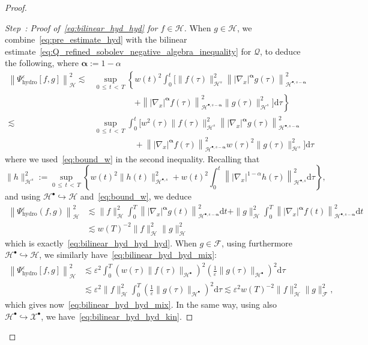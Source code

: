 \documentclass[10pt]{amsart}
\theoremstyle{definition}\newtheorem{defi}[theo]{Definition}\newtheorem{rema}[theo]{Remark}\newtheorem{exam}[theo]{Example}\newtheorem{exem}[theo]{Example}\newtheorem{nota}[theo]{Notation}
\newcommand{\hyd}{\mathrm{hydro}}
\renewcommand{\d}{\mathrm{d}}
\newcommand{\XX}{\mathcal{X}}
\newcommand{\HH}{\mathcal{H}}
\newcommand{\QQ}{\mathcal{Q}}
\newcommand{\FFF}{\mathscr{F}}
\newcommand{\HHH}{\mathscr{H}}
\newcommand{\SSs}{\HH}
\newcommand{\rSSs}[1]{\HH^{#1}}
\newcommand{\SSsp}{\HH^{\bullet}}
\newcommand{\rSSsp}[1]{\HH^{{\bullet}, #1}}
\newcommand{\SSSs}{\HHH}
\newcommand{\rSSSs}[1]{\HHH^{#1}}
\newcommand{\SSlp}{\XX^{\bullet}}
\newcommand{\SSSm}{\FFF}
\renewcommand*\le{\leqslant}
\newcommand*\eps{{\varepsilon}}
\newcounter{stepcount}
\newenvironment{step}[1]{\refstepcounter{stepcount}\begin{proof}[Step~\thestepcount: #1]}{\let\qed\relax\end{proof}}
\begin{document}
\begin{proof}
\setcounter{stepcount}{0}
\begin{step}{{Proof of~\eqref{eq:bilinear_hyd_hyd} for $f \in \SSSs$}}\label{prfprop5.3stp1}
When $g \in \SSSs$, we combine~\eqref{eq:pre_estimate_hyd} with the bilinear estimate~\eqref{eq:Q_refined_sobolev_negative_algebra_inequality} for $\QQ$, to deduce the following, where $\boldsymbol{\alpha} := 1 - \alpha$
\begin{align*}
\left\| \Psi^\eps_\hyd [f, g] \right\|_\SSSs^2
\lesssim & \sup_{0\,\le\,t\,<\,T}\left\{w(t)^2\int_0^t \Big[\|f(\tau) \|_{ \rSSs{s} }^2 \left\| |\nabla_x|^{\boldsymbol{\alpha}} g(\tau) \right\|_{\rSSsp{s-{\boldsymbol{\alpha}}}}^2 \right.\\
& \phantom{+++++} \left.+ \left\| |\nabla_x|^{\boldsymbol{\alpha}} f(\tau) \right\|_{\rSSsp{s-{\boldsymbol{\alpha}}}}^2 \| g(\tau) \|_{ \rSSs{s} }^2 \Big] \d \tau\right\}\\
\lesssim & \sup_{0\,\le\,t\,<\,T}\int_0^t \Big[w^2(\tau)\|f(\tau) \|_{ \rSSs{s} }^2 \left\| |\nabla_x|^{\boldsymbol{\alpha}} g(\tau) \right\|_{\rSSsp{s-{\boldsymbol{\alpha}}}}^2 \\
&\phantom{+++++} +\left\| |\nabla_x|^{\boldsymbol{\alpha}} f(\tau) \right\|_{\rSSsp{s-{\boldsymbol{\alpha}}}}^2 w(\tau)^2\| g(\tau) \|_{ \rSSs{s} }^2 \Big] \d \tau
\end{align*}
where we used~\eqref{eq:bound_w} in the second inequality. Recalling that
\[
\| h \|_{\rSSSs{s}}^2 := \sup_{0\,\le\,t\,<\,T} \left\{ w(t)^2 \| h(t) \|_{\rSSsp{s}}^2 + w(t)^2 \int_0^t \left\| |\nabla_x|^{1-\alpha} h(\tau) \right\|_{\rSSsp{s}}^2 \d \tau \right\},
\]
and using $\SSsp \hookrightarrow \SSs$ and~\eqref{eq:bound_w}, we deduce
\begin{align*}
\left\| \Psi^\eps_\hyd(f,g) \right\|_\SSSs^2 &\lesssim
\| f \|_{ \SSSs }^2 \int_0^T \left\| |\nabla_x|^{\boldsymbol{\alpha}} g(t) \right\|_{\rSSsp{s-{\boldsymbol{\alpha}}}}^2 \d t + \| g \|_{ \SSSs }^2 \int_0^T \left\| |\nabla_x|^{\boldsymbol{\alpha}} f(t) \right\|_{\rSSsp{s-{\boldsymbol{\alpha}}}}^2 \d t\\
& \lesssim w(T)^{-2} \| f \|_\SSSs^2 \| g \|_\SSSs^2
\end{align*}
which is exactly~\eqref{eq:bilinear_hyd_hyd_hyd}. When $g \in \SSSm$, using furthermore $\SSsp \hookrightarrow \SSs$, we similarly have~\eqref{eq:bilinear_hyd_hyd_mix}:
\begin{align*}
\left\| \Psi^\eps_\hyd [f, g] \right\|_\SSSs^2 &\lesssim \eps^2 \int_0^T \left(w(\tau)\|f(\tau) \|_{ \SSsp } \right)^2 \left(\frac{1}{\eps} \| g(\tau) \|_{\SSsp}\right)^2 \d \tau \\
&\lesssim \eps^2 \| f \|_\SSSs^2 \int_0^T \left(\frac{1}{\eps} \| g(\tau) \|_{\SSsp}\right)^2 \d \tau\lesssim \eps^2 w(T)^{-2} \| f \|_\SSSs^2 \| g \|_\SSSm^2,
\end{align*}
which gives now~\eqref{eq:bilinear_hyd_hyd_mix}. In the same way, using also $\SSsp \hookrightarrow \SSlp$, we have~\eqref{eq:bilinear_hyd_hyd_kin}.
\end{step}


\end{proof}
\end{document}

